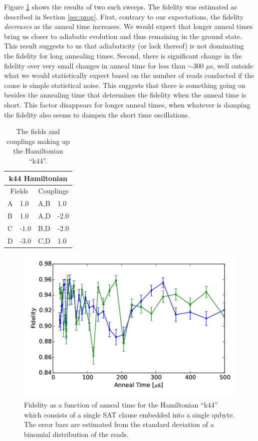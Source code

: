 Figure \ref{fig:k44_comparison} shows the results of two such sweeps.  The fidelity was estimated as described in Section \ref{sec:prog}.  First, contrary to our expectations, the fidelity \emph{decreases} as the anneal time increases.  We would expect that longer anneal times bring us closer to adiabatic evolution and thus remaining in the ground state.  This result suggests to us that adiabaticity (or lack thereof) is not dominating the fidelity for long annealing times. 
Second, there is significant change in the fidelity over very small changes in anneal time for less than $\sim 300$ $\mu$s, well outside what we would statistically expect based on the number of reads conducted if the cause is simple statistical noise.  This suggests that there is something going on besides the annealing time that determines the fidelity when the anneal time is short.  This factor disappears for longer anneal times, when whatever is damping the fidelity also seems to dampen the short time oscillations.
\begin{table}
	\begin{center}
\begin{tabular}{ | l | l | l | l |}
	\hline
	\multicolumn{4}{|c|}{k44 Hamiltonian} \\ \hline
	\multicolumn{2}{|c|}{Fields} & \multicolumn{2}{c|}{Couplings} \\ \hline
	A & 1.0 & A,B & 1.0 \\
	B & 1.0 & A,D & -2.0 \\
	C & -1.0 & B,D & -2.0 \\
	D & -3.0 & C,D & 1.0 \\ \hline
\end{tabular}
\end{center}
\caption[k44 Hamiltonian]{The fields and couplings making up the Hamiltonian ``k44''.}
\label{tab:k44}
\end{table}

\begin{figure}
	\includegraphics{img/k44.png}
	\caption[Single K44 Fidelity]{Fidelity as a function of anneal time for the Hamiltonian ``k44'' which consists of a single SAT clause embedded into a single qubyte.  The error bars are estimated from the standard deviation of a binomial distribution of the reads.}
	\label{fig:k44_comparison}
\end{figure}


